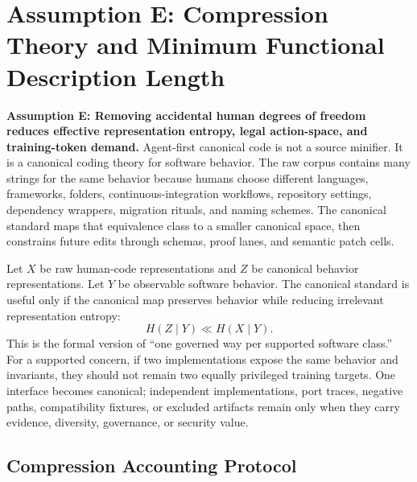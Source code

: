 \section{Assumption E: Compression Theory and Minimum Functional Description Length}

\textbf{Assumption E: Removing accidental human degrees of freedom reduces effective representation entropy, legal action-space, and training-token demand.} Agent-first canonical code is not a source minifier. It is a canonical coding theory for software behavior. The raw corpus contains many strings for the same behavior because humans choose different languages, frameworks, folders, continuous-integration workflows, repository settings, dependency wrappers, migration rituals, and naming schemes. The canonical standard maps that equivalence class to a smaller canonical space, then constrains future edits through schemas, proof lanes, and semantic patch cells.

Let $X$ be raw human-code representations and $Z$ be canonical behavior representations. Let $Y$ be observable software behavior. The canonical standard is useful only if the canonical map preserves behavior while reducing irrelevant representation entropy:
\begin{equation}
  H(Z \mid Y) \ll H(X \mid Y).
\end{equation}
This is the formal version of ``one governed way per supported software class.'' For a supported concern, if two implementations expose the same behavior and invariants, they should not remain two equally privileged training targets. One interface becomes canonical; independent implementations, port traces, negative paths, compatibility fixtures, or excluded artifacts remain only when they carry evidence, diversity, governance, or security value.

\subsection{Compression Accounting Protocol}

